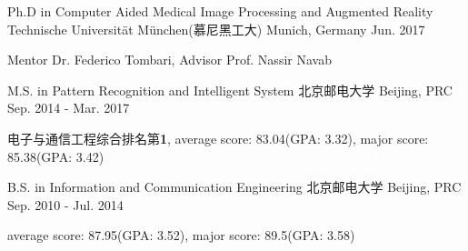 



\begin{cventries}

\cventry
{Ph.D in Computer Aided Medical Image Processing and Augmented Reality} %
{Technische Universität München(慕尼黑工大)} %
{Munich, Germany} %
{Jun. 2017} %
{ %
\begin{cvitems}
\item {Mentor Dr. Federico Tombari, Advisor Prof. Nassir Navab}
\end{cvitems}
}


\cventry
{M.S. in Pattern Recognition and Intelligent System} %
{北京邮电大学} %
{Beijing, PRC} %
{Sep. 2014 - Mar. 2017} %
{ %
\begin{cvitems}
\item {电子与通信工程综合排名第\textbf{1}, average score: 83.04(GPA: 3.32), major score: 85.38(GPA: 3.42)}
\end{cvitems}
}


\cventry
{B.S. in Information and Communication Engineering} %
{北京邮电大学} %
{Beijing, PRC} %
{Sep. 2010 - Jul. 2014} %
{ %
\begin{cvitems}
\item {average score: 87.95(GPA: 3.52), major score: 89.5(GPA: 3.58)}
\end{cvitems}
}%

\end{cventries}
